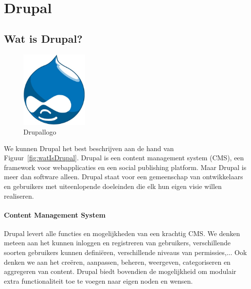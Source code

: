 \chapter{Drupal} \label{Drupal}

\section{Wat is Drupal?}

\begin{figure}
\vspace{-40pt}
\centering
\label{fig:drupalLogo}
\includegraphics[width=0.3\textwidth]{fig/drupalLogo}
\vspace{-30pt}
\centering
\caption{Drupallogo}
\centering
\vspace{-40pt}
\end{figure}
We kunnen Drupal het best beschrijven aan de hand van Figuur~\ref{fig:watIsDrupal}.
Drupal is een content management system (CMS), een framework voor webapplicaties en een social publishing platform. Maar Drupal is meer dan software alleen. Drupal staat voor een gemeenschap van ontwikkelaars en gebruikers met uiteenlopende doeleinden die elk hun eigen visie willen realiseren. \cite{drupalDefGuide}

\subsubsection{Content Management System}

Drupal levert alle functies en mogelijkheden van een krachtig CMS. We denken meteen aan het kunnen inloggen en registreren van gebruikers, verschillende soorten gebruikers kunnen defini\"{e}ren, verschillende niveaus van permissies,... Ook denken we aan het cre\"{e}ren, aanpassen, beheren, weergeven, categoriseren en aggregeren van content. Drupal biedt bovendien de mogelijkheid om modulair extra functionaliteit toe te voegen naar eigen noden en wensen.

